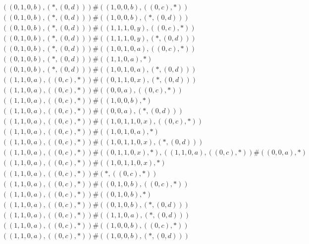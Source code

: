 \begin{align*}
	 & \qquad ((0, 1, 0, b), (*, (0, d))) \# ((1, 0, 0, b), ((0, c), *)) \\ 
	 & \qquad ((0, 1, 0, b), (*, (0, d))) \# ((1, 0, 0, b), (*, (0, d))) \\ 
	 & \qquad ((0, 1, 0, b), (*, (0, d))) \# ((1, 1, 1, 0, y), ((0, c), *)) \\ 
	 & \qquad ((0, 1, 0, b), (*, (0, d))) \# ((1, 1, 1, 0, y), (*, (0, d))) \\ 
	 & \qquad ((0, 1, 0, b), (*, (0, d))) \# ((1, 0, 1, 0, a), ((0, c), *)) \\ 
	 & \qquad ((0, 1, 0, b), (*, (0, d))) \# ((1, 1, 0, a), *) \\ 
	 & \qquad ((0, 1, 0, b), (*, (0, d))) \# ((1, 0, 1, 0, a), (*, (0, d))) \\ 
	 & \qquad ((1, 1, 0, a), ((0, c), *)) \# ((0, 1, 1, 0, x), (*, (0, d))) \\ 
	 & \qquad ((1, 1, 0, a), ((0, c), *)) \# ((0, 0, a), ((0, c), *)) \\ 
	 & \qquad ((1, 1, 0, a), ((0, c), *)) \# ((1, 0, 0, b), *) \\ 
	 & \qquad ((1, 1, 0, a), ((0, c), *)) \# ((0, 0, a), (*, (0, d))) \\ 
	 & \qquad ((1, 1, 0, a), ((0, c), *)) \# ((1, 0, 1, 1, 0, x), ((0, c), *)) \\ 
	 & \qquad ((1, 1, 0, a), ((0, c), *)) \# ((1, 0, 1, 0, a), *) \\ 
	 & \qquad ((1, 1, 0, a), ((0, c), *)) \# ((1, 0, 1, 1, 0, x), (*, (0, d))) \\ 
	 & \qquad ((1, 1, 0, a), ((0, c), *)) \# ((0, 1, 1, 0, x), *), ((1, 1, 0, a), ((0, c), *)) \# ((0, 0, a), *) \\ 
	 & \qquad ((1, 1, 0, a), ((0, c), *)) \# ((1, 0, 1, 1, 0, x), *) \\ 
	 & \qquad ((1, 1, 0, a), ((0, c), *)) \# (*, ((0, c), *)) \\ 
	 & \qquad ((1, 1, 0, a), ((0, c), *)) \# ((0, 1, 0, b), ((0, c), *)) \\ 
	 & \qquad ((1, 1, 0, a), ((0, c), *)) \# ((0, 1, 0, b), *) \\ 
	 & \qquad ((1, 1, 0, a), ((0, c), *)) \# ((0, 1, 0, b), (*, (0, d))) \\ 
	 & \qquad ((1, 1, 0, a), ((0, c), *)) \# ((1, 1, 0, a), (*, (0, d))) \\ 
	 & \qquad ((1, 1, 0, a), ((0, c), *)) \# ((1, 0, 0, b), ((0, c), *)) \\ 
	 & \qquad ((1, 1, 0, a), ((0, c), *)) \# ((1, 0, 0, b), (*, (0, d))) \\ 

\end{align*}
